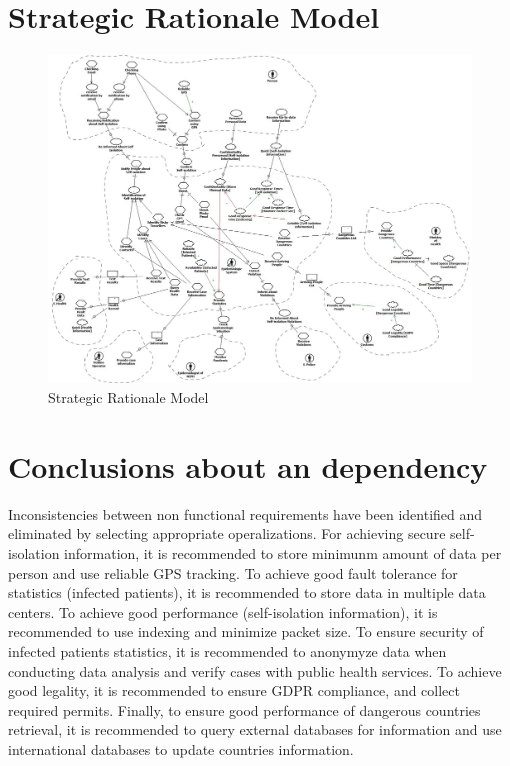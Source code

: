 \documentclass{VUMIFPSkursinis}
\begin{document}
\section{Strategic Rationale Model}
\begin{figure}[H]
    \center
    \includegraphics[scale=0.3]{StarUML/Strategic_Rationale.jpg}
    \caption{Strategic Rationale Model} %
    \label{img:strategicRationale}
\end{figure}
\section{Conclusions about an dependency}
	

Inconsistencies between non functional requirements have been identified and eliminated by selecting appropriate operalizations. For achieving 
secure self-isolation information, it is recommended to store minimunm amount of data per person and use reliable GPS tracking. To achieve good fault tolerance for 
statistics (infected patients), it is recommended to store data in multiple data centers. To achieve good performance (self-isolation information), it is recommended
to use indexing and minimize packet size. To ensure security of infected patients statistics, it is recommended to anonymyze data when conducting 
data analysis and verify cases with public health services. To achieve good legality, it is recommended to ensure GDPR compliance, and collect required permits. Finally, 
to ensure good performance of dangerous countries retrieval, it is recommended to query external databases for information and use international databases
to update countries information.
\end{document}
